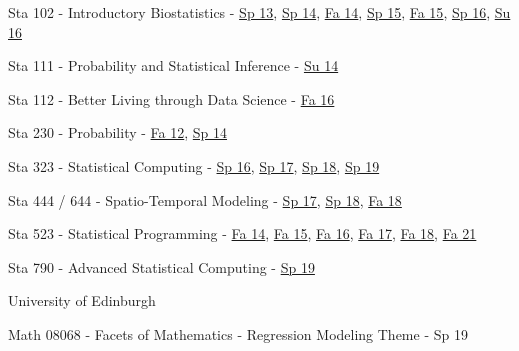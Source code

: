 \documentclass[margin,line]{res}
\begin{document}
\begin{resume}
\begin{list1}
\item[] Sta 102 - Introductory Biostatistics - \href{http://stat.duke.edu/courses/Spring13/sta102.001/}{Sp 13}, \href{https://stat.duke.edu/~cr173/Sta102_Sp14/}{Sp 14}, \href{https://stat.duke.edu/~cr173/Sta102_Fa14/}{Fa 14}, \href{https://stat.duke.edu/~cr173/Sta102_Sp15/}{Sp 15}, \href{https://stat.duke.edu/~cr173/Sta102_Fa15/}{Fa 15}, \href{http://stat.duke.edu/~cr173/Sta112_Sp16/}{Sp 16}, \href{http://stat.duke.edu/~cr173/Sta102_Su16/}{Su 16}

\item[] Sta 111 - Probability and Statistical Inference - \href{https://stat.duke.edu/~cr173/Sta111_Su14/}{Su 14}

\item[] Sta 112 - Better Living through Data Science - \href{http://stat.duke.edu/~cr173/Sta112_Fa16/}{Fa 16}

\item[] Sta 230 - Probability - \href{http://stat.duke.edu/courses/Spring12/sta104.1}{Fa 12}, \href{https://stat.duke.edu/~cr173/Sta230_Sp14/}{Sp 14}

\item[] Sta 323 - Statistical Computing - \href{http://stat.duke.edu/~cr173/Sta323_Sp16/}{Sp 16}, \href{http://stat.duke.edu/~cr173/Sta323_Sp17/}{Sp 17}, \href{http://stat.duke.edu/~cr173/Sta323_Sp18/}{Sp 18}, \href{http://stat.duke.edu/~cr173/Sta323_Sp19/}{Sp 19}

\item[] Sta 444 / 644 - Spatio-Temporal Modeling - \href{http://stat.duke.edu/~cr173/Sta444_Sp17/}{Sp 17}, \href{http://stat.duke.edu/~cr173/Sta444_Sp18/}{Sp 18}, \href{http://stat.duke.edu/~cr173/Sta444_Fa18/}{Fa 18}

\item[] Sta 523 - Statistical Programming - \href{https://stat.duke.edu/~cr173/Sta523_Fa14/}{Fa 14}, \href{https://stat.duke.edu/~cr173/Sta523_Fa15/}{Fa 15}, \href{https://stat.duke.edu/~cr173/Sta523_Fa16/}{Fa 16}, \href{https://stat.duke.edu/~cr173/Sta523_Fa17/}{Fa 17}, \href{https://stat.duke.edu/~cr173/Sta523_Fa18/}{Fa 18},
\href{https://sta523-fa21.github.io/}{Fa 21}

\item[] Sta 790 - Advanced Statistical Computing - \href{http://stat.duke.edu/~cr173/Sta790_Sp16/}{Sp 19}
\end{list1}

University of Edinburgh

\begin{list1}
\item[] Math 08068 - Facets of Mathematics - Regression Modeling Theme - Sp 19 


\end{list1}
\end{resume}
\end{document}
